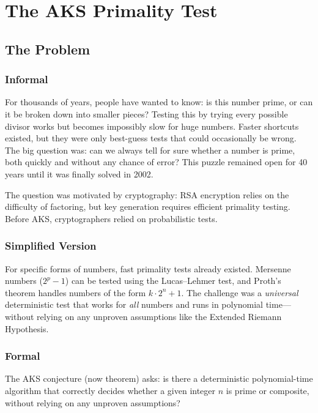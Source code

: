\let\LocalMacro\relax

\chapter{The AKS Primality Test}

\section{The Problem}

\subsection{Informal}
For thousands of years, people have wanted to know: is this number prime, or can it be broken down into smaller pieces? Testing this by trying every possible divisor works but becomes impossibly slow for huge numbers. Faster shortcuts existed, but they were only best-guess tests that could occasionally be wrong. The big question was: can we always tell for sure whether a number is prime, both quickly and without any chance of error? This puzzle remained open for 40 years until it was finally solved in 2002.

\begin{historicalbox}
The question was motivated by cryptography: RSA encryption relies on the difficulty of factoring, but key generation requires efficient primality testing. Before AKS, cryptographers relied on probabilistic tests.
\end{historicalbox}

\subsection{Simplified Version}
For specific forms of numbers, fast primality tests already existed. Mersenne numbers ($2^p - 1$) can be tested using the Lucas--Lehmer test, and Proth's theorem handles numbers of the form $k \cdot 2^n + 1$. The challenge was a \emph{universal} deterministic test that works for \emph{all} numbers and runs in polynomial time---without relying on any unproven assumptions like the Extended Riemann Hypothesis.

\subsection{Formal}

The AKS conjecture (now theorem) asks: is there a deterministic polynomial-time algorithm that correctly decides whether a given integer $n$ is prime or composite, without relying on any unproven assumptions?


